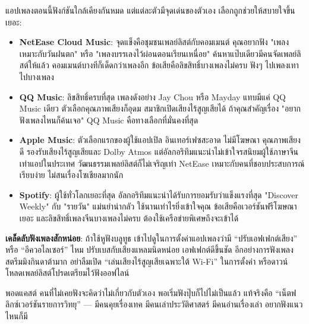 


แอปเพลงตอนนี้ฟังก์ชันใกล้เคียงกันหมด แต่แต่ละตัวมีจุดเด่นของตัวเอง เลือกถูกช่วยให้สบายใจขึ้นเยอะ:

\begin{itemize}
  \item \textbf{NetEase Cloud Music}: จุดแข็งคือชุมชนเพลย์ลิสต์กับคอมเมนต์ คุณอยากฟัง "เพลงเหมาะกับวันฝนตก" หรือ "เพลงบรรเลงไว้ผ่อนตอนเรียนเหนื่อย" ค้นหาแป๊บเดียวมีคนจัดเพลย์ลิสต์ให้แล้ว คอมเมนต์บางทีก็เด็ดกว่าเพลงอีก ข้อเสียคือลิขสิทธิ์บางเพลงไม่ครบ ฟังๆ ไปเพลงเทาไปบางเพลง
  \item \textbf{QQ Music}: ลิขสิทธิ์ครบที่สุด เพลงดังอย่าง Jay Chou หรือ Mayday แทบมีแค่ QQ Music เดียว ตัวเลือกคุณภาพเสียงก็อุดม สมาชิกเปิดเสียงไร้สูญเสียได้ ถ้าคุณสำคัญเรื่อง "อยากฟังเพลงไหนก็ค้นเจอ" QQ Music คือทางเลือกที่มั่นคงที่สุด
  \item \textbf{Apple Music}: ตัวเลือกแรกของผู้ใช้แอปเปิล อินเทอร์เฟซสะอาด ไม่มีโฆษณา คุณภาพเสียงดี รองรับเสียงไร้สูญเสียและ Dolby Atmos แต่อัลกอริทึมแนะนำไม่เข้าใจรสนิยมผู้ใช้ภาษาจีนเท่าแอปในประเทศ วัฒนธรรมเพลย์ลิสต์ก็ไม่เจริญเท่า NetEase เหมาะกับคนที่ชอบประสบการณ์เรียบง่าย ไม่สนเรื่องโซเชียลมากนัก
  \item \textbf{Spotify}: ผู้ใช้ทั่วโลกเยอะที่สุด อัลกอริทึมแนะนำได้รับการยอมรับว่าแข็งแรงที่สุด "Discover Weekly" กับ "รายวัน" แม่นยำน่ากลัว ใช้นานเท่าไรยิ่งเข้าใจคุณ ข้อเสียคือเวอร์ชันฟรีโฆษณาเยอะ และลิขสิทธิ์เพลงจีนบางเพลงไม่ครบ ต้องใช้เครือข่ายพิเศษถึงจะเข้าได้
\end{itemize}

\textbf{เคล็ดลับฟังเพลงสักหน่อย}: ถ้าใช้หูฟังบลูทูธ เข้าไปดูในการตั้งค่าแอปเพลงว่ามี “ปรับเอฟเฟกต์เสียง” หรือ “อีควอไลเซอร์” ไหม ปรับเบสกับเสียงแหลมนิดหน่อย เอฟเฟกต์ดีขึ้นชัด อีกอย่างการฟังเพลงสตรีมมิงกินดาต้ามาก อย่าลืมเปิด “เล่นเสียงไร้สูญเสียเฉพาะใต้ Wi-Fi” ในการตั้งค่า หรือดาวน์โหลดเพลย์ลิสต์โปรดเตรียมไว้ฟังออฟไลน์


พอดแคสต์ คนที่ไม่เคยฟังจะคิดว่าไม่เกี่ยวกับตัวเอง พอเริ่มฟังปุ๊บก็ไปไม่เป็นแล้ว แท้จริงคือ “เน็ตฟลิกซ์เวอร์ชันรายการวิทยุ” — มีคนคุยเรื่องเทค มีคนเล่าประวัติศาสตร์ มีคนอ่านเรื่องเล่า อยากฟังแนวไหนก็มี

